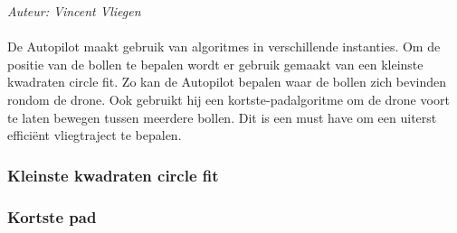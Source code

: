 {\em Auteur: Vincent  Vliegen}
\\
\\
\noindent
De Autopilot maakt gebruik van algoritmes in verschillende instanties. Om de positie van de bollen te bepalen wordt er gebruik gemaakt van een kleinste kwadraten circle fit. Zo kan de Autopilot bepalen waar de bollen zich bevinden rondom de drone. Ook gebruikt hij een kortste-padalgoritme om de drone voort te laten bewegen tussen meerdere bollen. Dit is een must have om een uiterst effici\"ent vliegtraject te bepalen.

\subsubsection{Kleinste kwadraten circle fit}
\label{subsec: Kleinste kwadraten circle fit}


\subsubsection{Kortste pad}
\label{subsec: Kortste pad}
